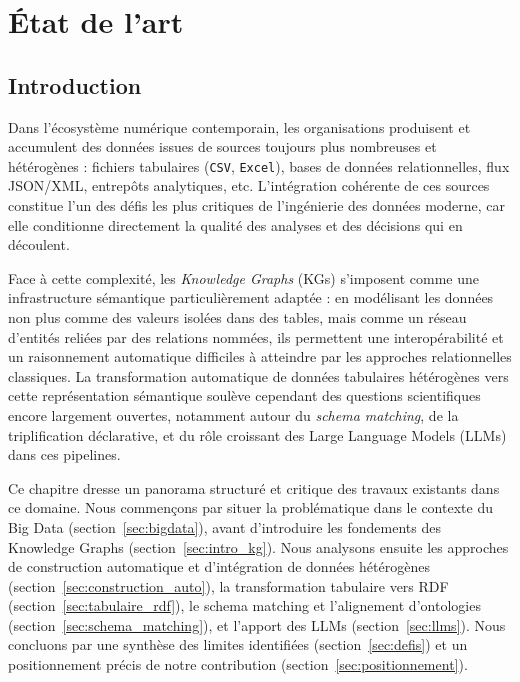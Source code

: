 
\chapter{État de l'art}\label{chap:etat_art}

\section{Introduction}\label{sec:intro_etat_art}
Dans l'écosystème numérique contemporain, les organisations produisent et accumulent des données issues de sources toujours plus nombreuses et hétérogènes : fichiers tabulaires (\texttt{CSV}, \texttt{Excel}), bases de données relationnelles, flux JSON/XML, entrepôts analytiques, etc. L'intégration cohérente de ces sources constitue l'un des défis les plus critiques de l'ingénierie des données moderne, car elle conditionne directement la qualité des analyses et des décisions qui en découlent.

Face à cette complexité, les \textit{Knowledge Graphs} (KGs) s'imposent comme une infrastructure sémantique particulièrement adaptée : en modélisant les données non plus comme des valeurs isolées dans des tables, mais comme un réseau d'entités reliées par des relations nommées, ils permettent une interopérabilité et un raisonnement automatique difficiles à atteindre par les approches relationnelles classiques. La transformation automatique de données tabulaires hétérogènes vers cette représentation sémantique soulève cependant des questions scientifiques encore largement ouvertes, notamment autour du \textit{schema matching}, de la triplification déclarative, et du rôle croissant des Large Language Models (LLMs) dans ces pipelines.

Ce chapitre dresse un panorama structuré et critique des travaux existants dans ce domaine. Nous commençons par situer la problématique dans le contexte du Big Data (section~\ref{sec:bigdata}), avant d'introduire les fondements des Knowledge Graphs (section~\ref{sec:intro_kg}). Nous analysons ensuite les approches de construction automatique et d'intégration de données hétérogènes (section~\ref{sec:construction_auto}), la transformation tabulaire vers RDF (section~\ref{sec:tabulaire_rdf}), le schema matching et l'alignement d'ontologies (section~\ref{sec:schema_matching}), et l'apport des LLMs (section~\ref{sec:llms}). Nous concluons par une synthèse des limites identifiées (section~\ref{sec:defis}) et un positionnement précis de notre contribution (section~\ref{sec:positionnement}).

